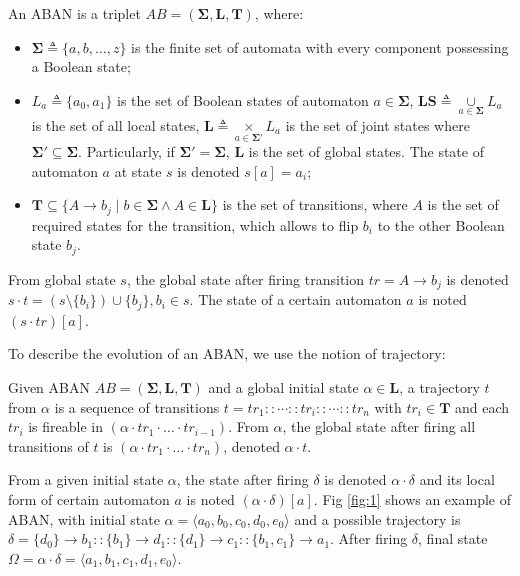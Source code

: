 \documentclass[runningheads]{llncs}
\newcommand{\acm}[3]{\{#1\}\rightarrow#3}
\begin{document}
\begin{definition}[ABAN]
An ABAN is a triplet $AB = (\mathbf{\Sigma},\mathbf{L},\mathbf{T})$, where:
\begin{itemize}
\item $\mathbf{\Sigma}\triangleq\{a,b,\ldots,z\}$ is the finite set of automata with every component possessing a Boolean state;
\item $L_a\triangleq\{a_0,a_1\}$ is the set of Boolean states of automaton $a\in \mathbf{\Sigma}$, $\mathbf{LS}\triangleq \underset{a\in \mathbf{\Sigma}}{\cup} L_a$ is the set of all local states,  $\mathbf{L}\triangleq \underset{a\in \mathbf{\Sigma'}}{\times} L_a$ is the set of joint states where $\mathbf{\Sigma'}\subseteq\mathbf{\Sigma}$. Particularly, if $\mathbf{\Sigma'}=\mathbf{\Sigma}$, $\mathbf{L}$ is the set of global states. 
The state of automaton $a$ at state $s$ is denoted $s[a]=a_i$;
\item $\mathbf{T}\subseteq \{A\to b_j\mid b\in \mathbf{\Sigma} \land A\in \mathbf{L}\}$ is the set of transitions, where $A$ is the set of required states for the transition, which allows to flip $b_i$ to the other Boolean state $b_j$.
\end{itemize}
\end{definition}

\begin{definition}[Dynamics]
    From global state $s$, the global state after firing transition $tr=A\to b_j$ is denoted $s \cdot t = (s \setminus \{b_i\}) \cup \{b_j\}, b_i \in s$.
    The state of a certain automaton $a$ is noted $(s\cdot tr)[a]$.
\end{definition}
To describe the evolution of an ABAN, we use the notion of trajectory:
\begin{definition}[Trajectory]
Given ABAN $AB = (\mathbf{\Sigma},\mathbf{L},\mathbf{T})$ and a global initial state $\alpha\in \mathbf{L}$, a trajectory $t$ from $\alpha$ is a sequence of transitions $t=tr_1::\cdots :: tr_i::\cdots ::tr_n$ with $tr_i\in\mathbf{T}$ and each $tr_i$ is fireable in $(\alpha \cdot tr_1 \cdot \ldots \cdot tr_{i-1})$.
From $\alpha$, the global state after firing all transitions of $t$ is $(\alpha \cdot tr_1 \cdot \ldots \cdot tr_n)$, denoted $\alpha \cdot t$.
\end{definition}

From a given initial state $\alpha$, the state after firing $\delta$ is denoted $\alpha\cdot \delta$ and its local form of certain automaton $a$ is noted $(\alpha\cdot \delta)[a]$.
Fig \ref{fig:1} shows an example of ABAN, with initial state $\alpha=\langle a_0,b_0,c_0,d_0,e_0\rangle$ and a possible trajectory is $\delta=\acm{d_0}{b_0}{b_1}::\acm{b_1}{d_0}{d_1}::\acm{d_1}{c_0}{c_1}::\acm{b_1,c_1}{a_0}{a_1}$. After firing $\delta$, final state $\Omega=\alpha\cdot \delta=\langle a_1,b_1,c_1,d_1,e_0\rangle$.
\end{document}
